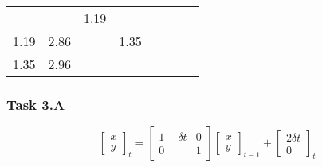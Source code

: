 \documentclass[11pt]{article}
\begin{document}
\begin{longtable}[]{@{}llllllll@{}}
\begin{minipage}[t]{0.10\columnwidth}
\end{minipage} & \begin{minipage}[t]{0.10\columnwidth}\raggedright
\(\begin{array}{cc}0.94 & 1.19\\1.19 & 2.86\end{array}\)\strut
\end{minipage} & \begin{minipage}[t]{0.10\columnwidth}\raggedright
\(\begin{array}{cc}1.07 & 1.35\\1.35 & 2.96\end{array}\)\strut
\end{minipage}\tabularnewline
\bottomrule
\end{longtable}

    \hypertarget{task-3.a}{%
\subsubsection{Task 3.A}\label{task-3.a}}

    \[ \left[\begin{array}{cc}x\\y\end{array} \right]_t = \left[\begin{array}{cc}1+\delta t & 0\\0 & 1\end{array} \right] \left[\begin{array}{cc}x\\y\end{array} \right]_{t-1} + \left[\begin{array}{cc}2\delta t\\0\end{array} \right]_t \]
\end{document}
